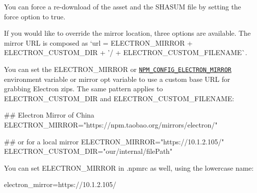 You can force a re-\/download of the asset and the {\ttfamily S\+H\+A\+S\+UM} file by setting the {\ttfamily force} option to {\ttfamily true}.

If you would like to override the mirror location, three options are available. The mirror U\+RL is composed as `url = E\+L\+E\+C\+T\+R\+O\+N\+\_\+\+M\+I\+R\+R\+OR + E\+L\+E\+C\+T\+R\+O\+N\+\_\+\+C\+U\+S\+T\+O\+M\+\_\+\+D\+IR + '/\textquotesingle{} + E\+L\+E\+C\+T\+R\+O\+N\+\_\+\+C\+U\+S\+T\+O\+M\+\_\+\+F\+I\+L\+E\+N\+A\+M\+E\`{}.

You can set the {\ttfamily E\+L\+E\+C\+T\+R\+O\+N\+\_\+\+M\+I\+R\+R\+OR} or \href{https://docs.npmjs.com/misc/config#environment-variables}{\tt {\ttfamily N\+P\+M\+\_\+\+C\+O\+N\+F\+I\+G\+\_\+\+E\+L\+E\+C\+T\+R\+O\+N\+\_\+\+M\+I\+R\+R\+OR}} environment variable or {\ttfamily mirror} opt variable to use a custom base U\+RL for grabbing Electron zips. The same pattern applies to {\ttfamily E\+L\+E\+C\+T\+R\+O\+N\+\_\+\+C\+U\+S\+T\+O\+M\+\_\+\+D\+IR} and {\ttfamily E\+L\+E\+C\+T\+R\+O\+N\+\_\+\+C\+U\+S\+T\+O\+M\+\_\+\+F\+I\+L\+E\+N\+A\+ME}\+:


\begin{DoxyCode}
## Electron Mirror of China
ELECTRON\_MIRROR="https://npm.taobao.org/mirrors/electron/"

## or for a local mirror
ELECTRON\_MIRROR="https://10.1.2.105/"
ELECTRON\_CUSTOM\_DIR="our/internal/filePath"
\end{DoxyCode}


You can set E\+L\+E\+C\+T\+R\+O\+N\+\_\+\+M\+I\+R\+R\+OR in {\ttfamily .npmrc} as well, using the lowercase name\+:


\begin{DoxyCode}
electron\_mirror=https://10.1.2.105/
\end{DoxyCode}
 